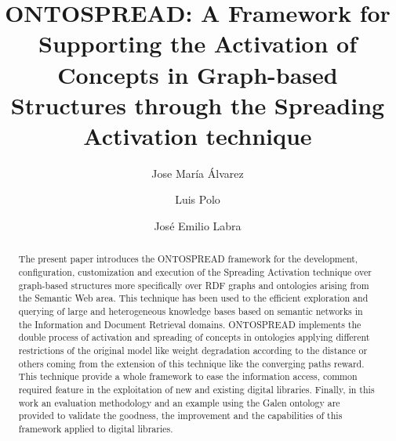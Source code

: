 \documentclass{llncs}
\begin{document}
\title{ONTOSPREAD: A Framework for Supporting the Activation of Concepts in Graph-based Structures through the Spreading
Activation technique}


\author{Jose Mar\'{i}a \'{A}lvarez \and Luis Polo
 \and Jos\'{e} Emilio Labra} 







\maketitle

\begin{abstract}
The present paper introduces the ONTOSPREAD framework for the development,
configuration, customization and execution of the Spreading Activation
technique over graph-based structures more specifically over RDF graphs and ontologies 
arising from the Semantic Web area. This technique has been used to
the efficient exploration and querying of large and heterogeneous knowledge bases 
based on semantic networks in the Information and Document Retrieval domains. 
ONTOSPREAD implements the double process of activation and spreading of concepts in ontologies applying 
different restrictions of the original model like weight degradation according to the distance or 
others coming from the extension of this technique like the converging paths reward. 
This technique provide a whole framework to ease the information access, 
common required feature in the exploitation of new and existing digital libraries. 
Finally, in this work an evaluation methodology and an example using the Galen ontology 
are provided to validate the goodness, the improvement and the capabilities of this framework applied 
to digital libraries.
\end{abstract}
\end{document}
